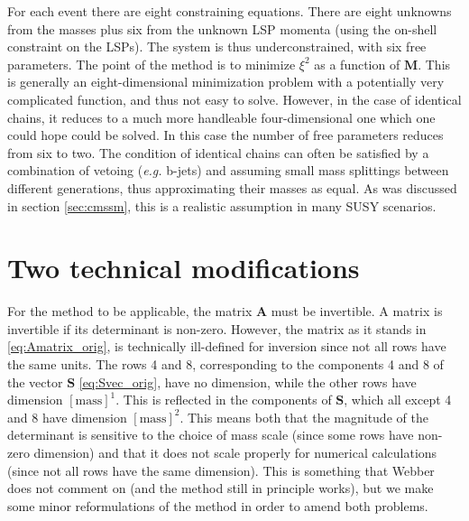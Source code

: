 \documentclass[twoside,english]{uiofysmaster}
\begin{document}
For each event there are eight constraining equations. There are eight unknowns from the masses plus six from the unknown LSP momenta (using the on-shell constraint on the LSPs). The system is thus underconstrained, with six free parameters. The point of the method is to minimize $\xi^2$ as a function of $\mathbf{M}$. This is generally an eight-dimensional minimization problem with a potentially very complicated function, and thus not easy to solve. However, in the case of identical chains, it reduces to a much more handleable four-dimensional one which one could hope could be solved. In this case the number of free parameters reduces from six to two. The condition of identical chains can often be satisfied by a combination of vetoing ({\it e.g.} b-jets) and assuming small mass splittings between different generations, thus approximating their masses as equal. As was discussed in section \ref{sec:cmssm}, this is a realistic assumption in many SUSY scenarios.

\section{Two technical modifications}\label{sec:dimension_fixing}
For the method to be applicable, the matrix $\mathbf{A}$ must be invertible. A matrix is invertible if its determinant is non-zero. However, the matrix as it stands in \eqref{eq:Amatrix_orig}, is technically ill-defined for inversion since not all rows have the same units. The rows 4 and 8, corresponding to the components 4 and 8 of the vector $\mathbf{S}$ \eqref{eq:Svec_orig}, have no dimension, while the other rows have dimension $[\mathrm{mass}]^1$. This is reflected in the components of $\mathbf{S}$, which all except 4 and 8 have dimension $[\mathrm{mass}]^2$. This means both that the magnitude of the determinant is sensitive to the choice of mass scale (since some rows have non-zero dimension) and that it does not scale properly for numerical calculations (since not all rows have the same dimension). This is something that Webber does not comment on (and the method still in principle works), but we make some minor reformulations of the method in order to amend both problems.
\end{document}
